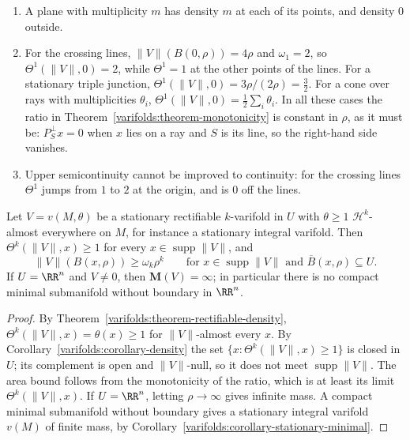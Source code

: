 \begin{example}\label{varifolds:example-densities}
\begin{enumerate}
\item A plane with multiplicity $m$ has density $m$ at each of its points, and density $0$ outside.
\item For the crossing lines, $\|V\|(B(0, \rho)) = 4\rho$ and $\omega_1 = 2$, so $\Theta^1(\|V\|, 0) = 2$, while $\Theta^1 = 1$ at the other points of the lines. For a stationary triple junction,
$\Theta^1(\|V\|, 0) = 3\rho/(2\rho) = \frac32$. For a cone over rays with multiplicities $\theta_i$, $\Theta^1(\|V\|, 0) = \frac12\sum_i\theta_i$. In all these cases the ratio in
Theorem~\ref{varifolds:theorem-monotonicity} is constant in $\rho$, as it must be: $P_S^\perp x = 0$ when $x$ lies on a ray and $S$ is its line, so the right-hand side vanishes.
\item Upper semicontinuity cannot be improved to continuity: for the crossing lines $\Theta^1$ jumps from $1$ to $2$ at the origin, and is $0$ off the lines.
\end{enumerate}
\end{example}

\begin{corollary}\label{varifolds:corollary-lower-bound}
Let $V = v(M, \theta)$ be a stationary rectifiable $k$-varifold in $U$ with $\theta \geq 1$ $\mathcal{H}^k$-almost everywhere on $M$, for instance a stationary integral varifold. Then
$\Theta^k(\|V\|, x) \geq 1$ for every $x \in \operatorname{supp}\|V\|$, and
\[
\|V\|(B(x, \rho)) \geq \omega_k\rho^k \qquad\text{for } x \in \operatorname{supp}\|V\| \text{ and } \overline{B}(x, \rho) \subseteq U .
\]
If $U = \RR^n$ and $V \neq 0$, then $\mathbf{M}(V) = \infty$; in particular there is no compact minimal submanifold without boundary in $\RR^n$.
\end{corollary}

\begin{proof}
By Theorem~\ref{varifolds:theorem-rectifiable-density}, $\Theta^k(\|V\|, x) = \theta(x) \geq 1$ for $\|V\|$-almost every $x$. By Corollary~\ref{varifolds:corollary-density} the set
$\{x : \Theta^k(\|V\|, x) \geq 1\}$ is closed in $U$; its complement is open and $\|V\|$-null, so it does not meet $\operatorname{supp}\|V\|$. The area bound follows from the monotonicity of the ratio, which is at
least its limit $\Theta^k(\|V\|, x)$. If $U = \RR^n$, letting $\rho \to \infty$ gives infinite mass. A compact minimal submanifold without boundary gives a stationary integral varifold $v(M)$ of finite mass, by
Corollary~\ref{varifolds:corollary-stationary-minimal}.
\end{proof}

